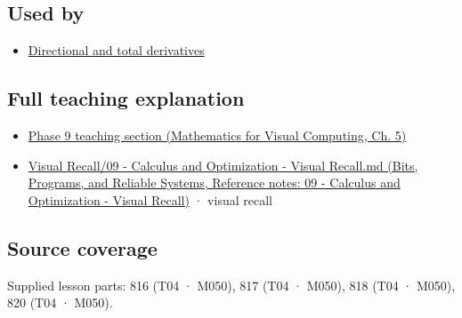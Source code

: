 \subsection{Used by}\label{appendix-677b59746ae0-used-by}

\hypertarget{appendix-677b59746ae0-used-by}{}

\begin{itemize}
\tightlist
\item
  \hyperref[appendix-e2d476574aab]{Directional and total derivatives}
\end{itemize}

\subsection{Full teaching explanation}\label{appendix-677b59746ae0-full-teaching-explanation}

\hypertarget{appendix-677b59746ae0-full-teaching-explanation}{}

\begin{itemize}
\tightlist
\item
  \href{../02-Mathematics-for-Visual-Computing/main.pdf\#nameddest=02-foundations-ii-ch021-multivariable-derivatives-and-sensitivity-1}{Phase 9 teaching section (Mathematics for Visual Computing, Ch. 5)}
\item
  \href{../01-Bits-Programs-and-Reliable-Systems/main.pdf\#nameddest=appendix-adf48f5dc5c1}{Visual Recall/09 - Calculus and Optimization - Visual Recall.md (Bits, Programs, and Reliable Systems, Reference notes: 09 - Calculus and Optimization - Visual Recall)} · visual recall
\end{itemize}

\subsection{Source coverage}\label{appendix-677b59746ae0-source-coverage}

\hypertarget{appendix-677b59746ae0-source-coverage}{}

Supplied lesson parts: 816 (T04 · M050), 817 (T04 · M050), 818 (T04 · M050), 820 (T04 · M050).

